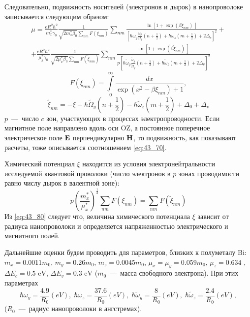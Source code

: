 Следовательно, подвижность носителей (электронов и дырок) в нанопроволоке записывается следующим образом:
\begin{multline} \label{eq:43_70} 
\mu =\frac{eR^2{\hbar }^2}{m^*_x \gamma_0}\frac{1}{\sqrt{2m^*_x \beta_0}\sum_{nm}{F\left(\xi_{nm}\right)}}\sum_{nm}{\frac{\ln \left[1+{\exp \left(\beta {\xi }_{nm}\right)\ }\right]}{\left[\hbar \omega_y\frac{\omega_y}{\Omega_y} \left(n+\frac{1}{2}\right)+\hbar \omega_z\left(m+\frac{1}{2}\right)+ 2\Delta_c\right]^2}}+\\
+\frac{eR^2 \hbar^2}{\mu^*_x \gamma_0}\frac{1}{\sqrt{2\mu^*_x \beta_0}\sum_{nm}{F\left(\widetilde{\xi }_{nm}\right)}}\sum_{nm}{\frac{\ln \left[1+{\exp \left(\beta \widetilde{\xi}_{nm}\right)\ }\right]}{p{\left[\hbar \widetilde{\omega}_y \frac{\widetilde{\omega}_y}{\widetilde{\Omega}_y}\left(n+\frac{1}{2}\right)+\hbar \widetilde{\omega}_z \left(m+\frac{1}{2}\right)+2{\Delta }_v\right]}^2}} 
\end{multline}
\[
F\left(\xi_{nm}\right)=\int\limits^{\infty }_0 {\frac{dx}{\exp \left(x^2-\beta {\xi }_{nm}\right) +1}},
\]
\[
\widetilde{\xi }_{nm}=-\xi -\hbar \widetilde{\Omega}_y\left(n+\frac{1}{2}\right)-\hbar \widetilde{\omega}_z\left(m+\frac{1}{2}\right)+\Delta_0+\Delta_v
\]
$p$~---~число $c$ зон, участвующих в процессах электропроводности. Если магнитное поле направлено вдоль оси OZ, а постоянное поперечное электрическое поле $\boldsymbol{\mathbf{E}}$ перпендикулярно $\boldsymbol{\mathbf{H}}$, то подвижность, как показывают расчеты, тоже описывается соотношением \eqref{eq:43_70}.

Химический потенциал $\xi $ находится из условия электронейтральности исследуемой квантовой проволоки (число электронов в $p$ зонах проводимости равно числу дырок в валентной зоне):
\begin{equation} \label{eq:43_80} 
p{\left(\frac{m^*_x}{{\mu }^*_x}\right)}^{\frac{1}{2}}\sum_{nm}{F\left({\xi }_{nm}\right)}=\sum_{nm}{F\left({\widetilde{\xi }}_{nm}\right)} 
\end{equation}
Из \eqref{eq:43_80} следует что, величина химического потенциала $\xi $ зависит от радиуса нанопроволоки и определяется напряженностью электрического и магнитного полей.

Дальнейшие оценки будем проводить для параметров, близких к полуметалу Bi: $m_x=0.0011m_0$, $m_y=0.26m_0$, $m_z=0.0045m_0$, ${\mu }_x={\mu }_y= 0.059 m_0$, $\mu_z = 0.634$ \cite{Levin2009a}, $\Delta E_c=0.5\text{ eV}$, $\Delta E_v =0.3\text{ eV}$ ($m_0$~---~масса свободного электрона). При этих параметрах
\[
\hbar {\omega }_y=\frac{4.9}{R_0}\left(eV\right),\;
\hbar {\omega }_z=\frac{37.6}{R_0}\left(eV\right),\;
\hbar {\widetilde{\omega }}_y=\frac{8}{R_0}\left(eV\right),\;
\hbar {\widetilde{\omega }}_z=\frac{2.4}{R_0}\left(eV\right),
\] 
($R_0$~---~радиус нанопроволоки в ангстремах).

